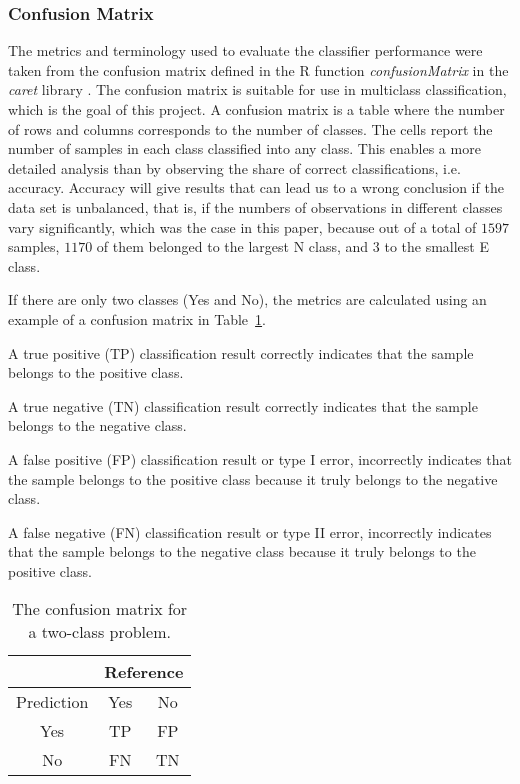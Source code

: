 \documentclass[preprint,12pt]{elsarticle}
\begin{document}
\subsubsection{Confusion Matrix}

The metrics and terminology used to evaluate the classifier performance were taken from the confusion matrix defined in the R function \textit{confusionMatrix} in the \textit{caret} library \cite{kuhn2008building, altman1994diagnostic, dg1994diagnostic, velez2007balanced, rdocumentationConfusionMatrixFunction}. The confusion matrix is suitable for use in multiclass classification, which is the goal of this project. A confusion matrix is a table where the number of rows and columns corresponds to the number of classes. The cells report the number of samples in each class classified into any class. This enables a more detailed analysis than by observing the share of correct classifications, i.e. accuracy. Accuracy will give results that can lead us to a wrong conclusion if the data set is unbalanced, that is, if the numbers of observations in different classes vary significantly, which was the case in this paper, because out of a total of $1597$ samples, $1170$ of them belonged to the largest N class, and $3$ to the smallest E class.

If there are only two classes (Yes and No), the metrics are calculated using an example of a confusion matrix in Table~\ref{tab:cm}.

A true positive (TP) classification result correctly indicates that the sample belongs to the positive class.

A true negative (TN) classification result correctly indicates that the sample belongs to the negative class.
 
A false positive (FP) classification result or type I error, incorrectly indicates that the sample belongs to the positive class because it truly belongs to the negative class.

A false negative (FN) classification result or type II error, incorrectly indicates that the sample belongs to the negative class because it truly belongs to the positive class.

\begin{table}[!ht]
	\centering
	\begin{tabular}{|c|c|c|}
		\hline
		 & \multicolumn{2}{|c|}{Reference} \\ \hline
        Prediction & Yes & No \\ \hline
        Yes & TP & FP \\ \hline
        No & FN & TN \\ \hline
	\end{tabular}
	\caption{The confusion matrix for a two-class problem.}
	\label{tab:cm}
\end{table}
\end{document}
